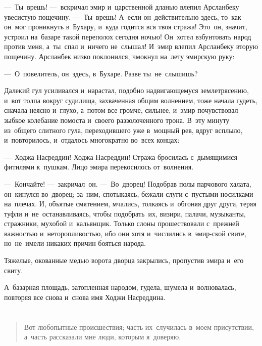 \documentclass[12pt,a4paper]{book}
\begin{document}
—~Ты~врешь! —~вскричал эмир и~царственной дланью влепил Арсланбеку увесистую пощечину. —~Ты~врешь! А~если он~действительно здесь, то~как он~мог проникнуть в~Бухару, и~куда годится вся твоя стража! Это~он, значит, устроил на~базаре такой переполох сегодня ночью! Он~хотел взбунтовать народ против меня, а~ты~спал и~ничего не~слышал! И~эмир влепил Арсланбеку вторую пощечину. Арсланбек низко поклонился, чмокнул на~лету эмирскую руку:

—~О~повелитель, он~здесь, в~Бухаре. Разве ты~не~слышишь?

Далекий гул усиливался и~нарастал, подобно надвигающемуся землетрясению, и~вот толпа вокруг судилища, захваченная общим волнением, тоже начала гудеть, сначала неясно и~глухо, а~потом все громче, сильнее, и~эмир почувствовал зыбкое колебание помоста и~своего раззолоченного трона. В~эту минуту из~общего слитного гула, переходившего уже в~мощный рев, вдруг всплыло, и~повторилось, и~отдалось многократно во~всех концах:

—~Ходжа Насреддин! Ходжа Насреддин! Стража бросилась с~дымящимися фитилями к~пушкам. Лицо эмира перекосилось от~волнения.

—~Кончайте! —~закричал~он. —~Во~дворец! Подобрав полы парчового халата, он~кинулся во~дворец; за~ним, спотыкаясь, бежали слуги с~пустыми носилками на~плечах. И, объятые смятением, мчались, толкаясь и~обгоняя друг друга, теряя туфли и~не~останавливаясь, чтобы подобрать~их, визири, палачи, музыканты, стражники, мухобой и~кальянщик. Только слоны прошествовали с~прежней важностью и~неторопливостью, ибо они хотя и~числились в~эмир-ской свите, но~не~имели никаких причин бояться народа.

Тяжелые, окованные медью ворота дворца закрылись, пропустив эмира и~его свиту.

А~базарная площадь, затопленная народом, гудела, шумела и~волновалась, повторяя все снова и~снова имя Ходжи Насреддина.


\part{}

\begin{quote}
Вот любопытные происшествия; часть их~случилась в~моем присутствии, а~часть рассказали мне люди, которым я~доверяю.
\end{quote}

\chapter{}
\end{document}
